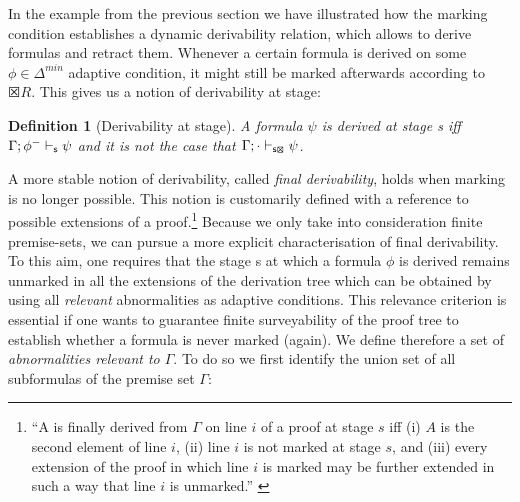 \documentclass[]{article}
\newtheorem{definition}{Definition}
\newcommand{\Turn}[2]
    { {#1}\vdash_{\textbf{\sf s}}  {#2}}
\newcommand{\TurnMarked}[2]
    { {#1}\vdash_{\textbf{\sf s\XBox}}  {#2}}
\begin{document}
In the example from the previous section we have illustrated how the marking condition establishes a dynamic derivability relation, which allows to derive formulas and retract them. Whenever a certain formula is derived on some $\phi\in \Delta^{min}$ adaptive condition, it might still be marked afterwards according to $\XBox R$.
This gives us a notion of derivability at stage:

\begin{definition}[Derivability at stage]
A formula $\psi$ is derived at stage {\sf s}  iff $\Turn{\Gamma; \phi^{-}}{\psi}$ and it is not the case that $\TurnMarked{\Gamma; \cdot}{\psi}$.
\end{definition}

A more stable notion of derivability, called \emph{final derivability}, holds when marking is no longer possible. This notion is customarily defined with a reference to possible extensions of a proof.\footnote{``A is finally derived from $\Gamma$ on line $i$ of a proof at stage $s$ iff (i) $A$ is the second element of line $i$, (ii) line $i$ is not marked at stage $s$, and (iii) every extension of the proof in which line $i$ is marked may be further extended in such a way that line $i$ is unmarked.'' \cite[229]{batens07}} Because we only take into consideration finite premise-sets, we can pursue a more explicit characterisation of final derivability.
%
%
To this aim, one requires that the stage {\sf s} at which a formula $\phi$ is derived remains unmarked in all the extensions of the derivation tree which can be obtained by using all \textit{relevant} abnormalities as adaptive conditions. This relevance criterion is essential if one wants to guarantee finite surveyability of the proof tree to establish whether a formula is never marked (again). We define therefore a set of \textit{abnormalities relevant to $\Gamma$}. To do so we first identify the union set of all subformulas of the premise set $\Gamma$:
\end{document}
